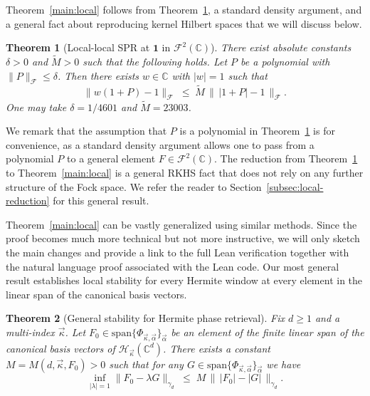 \documentclass[11pt]{amsart}
\newtheorem{theorem}{Theorem}[section]
\theoremstyle{remark}
\begin{document}
Theorem~\ref{main:local} follows from Theorem~\ref{thm:local}, a standard density argument, and a general fact about reproducing kernel Hilbert spaces that we will discuss below. 
\begin{theorem}[Local-local SPR at $\mathbf{1}$ in $\mathcal{F}^2(\mathbb{C})$]\label{thm:local}
There exist absolute constants $\delta > 0$ and $\widetilde{M} > 0$ such
that the following holds.  Let $P$ be a polynomial with
$\lVert P \rVert_{\mathcal{F}} \le \delta$.  Then there exists $w \in \mathbb{C}$ with $\lvert w \rvert = 1$
such that
\[
\lVert w(1+P) - 1 \rVert_{\mathcal{F}}
\;\le\;
\widetilde{M}\,
\bigl\|\, \lvert 1+P \rvert - 1 \,\bigr\|_{\mathcal{F}}.
\]
One may take $\delta = 1/4601$ and $\widetilde{M} = 23003$.
\end{theorem}
We remark that the assumption that $P$ is a polynomial in Theorem~\ref{thm:local} is for convenience, as a standard density argument allows one to pass from a polynomial $P$ to a general element $F\in \mathcal{F}^2(\mathbb{C})$. The reduction from Theorem~\ref{thm:local} to Theorem~\ref{main:local} is a general RKHS fact that does not rely on any further structure of the Fock space. We refer the reader to Section~\ref{subsec:local-reduction} for this general result.
 \vspace{0.5em}


Theorem~\ref{main:local} can be vastly generalized using similar methods. Since the proof becomes much more technical but not more instructive, we will only sketch the main changes and provide a link to the full Lean verification together with the natural language proof associated with the Lean code. Our most general result establishes local stability for every Hermite window at every element in the linear span of the canonical basis vectors.
\begin{theorem}[General stability for Hermite phase retrieval]\label{thm:local_Gen}
Fix $d\geq 1$ and a multi-index $\vec\kappa$. Let $F_0\in \text{span} \{\Phi_{\vec \kappa,\vec\alpha}\}_{\vec \alpha}$ be an element of the finite linear span of the canonical basis vectors of $\mathcal{H}_{\vec\kappa}(\mathbb{C}^d)$. There exists a constant $M=M(d,\vec\kappa,F_0)>0$ such
that for any $G\in \text{span}\{\Phi_{\vec \kappa,\vec\alpha}\}_{\vec \alpha}$ we have
\[
\inf_{|\lambda|=1}\lVert F_0 - \lambda G \rVert_{\gamma_d}
\;\le\;
M\,
\bigl\|\, \lvert F_0 \rvert - |G| \,\bigr\|_{\gamma_d}.
\]
\end{theorem}
\end{document}
